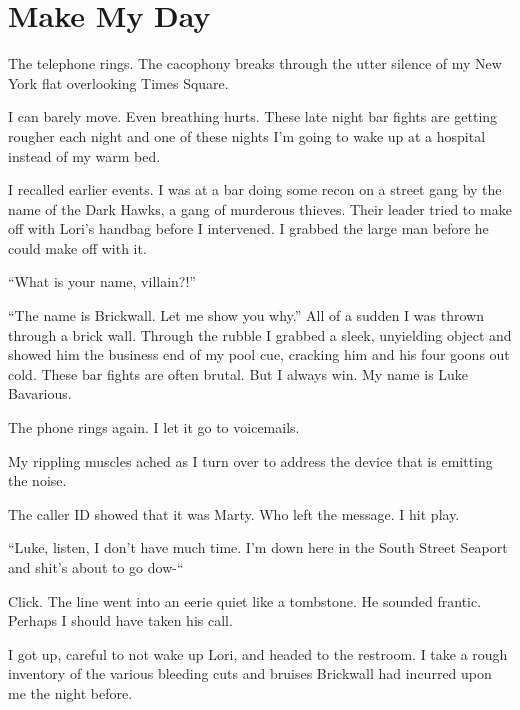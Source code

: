 \chapter{Make My Day}


The telephone rings. The cacophony breaks through the utter silence
of my New York flat overlooking Times Square.



I can barely move. Even breathing hurts. These late night bar
fights are getting rougher each night and one of these nights
I'm going to wake up at a hospital instead of my warm
bed.



I recalled earlier events. I was at a bar doing some recon on a
street gang by the name of the Dark Hawks, a gang of murderous
thieves. Their leader tried to make off with Lori's handbag
before I intervened. I grabbed the large man before he could make
off with it.



``What is your name, villain?!''



``The name is Brickwall. Let me show you why.'' All of a
sudden I was thrown through a brick wall. Through the rubble I
grabbed a sleek, unyielding object and showed him the business end
of my pool cue, cracking him and his four goons out cold. These bar
fights are often brutal. But I always win. My name is Luke
Bavarious.



The phone rings again. I let it go to voicemails.



My rippling muscles ached as I turn over to address the device that
is emitting the noise.

The caller ID showed that it was Marty. Who left the message. I hit
play.



``Luke, listen, I don't have much time. I'm down
here in the South Street Seaport and shit's about to go
dow-``



Click. The line went into an eerie quiet like a tombstone. He
sounded frantic. Perhaps I should have taken his call.



I got up, careful to not wake up Lori, and headed to the restroom.
I take a rough inventory of the various bleeding cuts and bruises
Brickwall had incurred upon me the night before.



